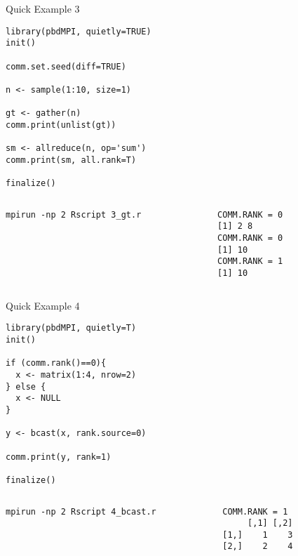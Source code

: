 \begin{frame}
  \begin{exampleblock}{Quick Example 3}
\begin{lstlisting}[title=Reduce and Gather: 3\_gt.r]
library(pbdMPI, quietly=TRUE)
init()

comm.set.seed(diff=TRUE)

n <- sample(1:10, size=1)

gt <- gather(n)
comm.print(unlist(gt))

sm <- allreduce(n, op='sum')
comm.print(sm, all.rank=T)

finalize()
\end{lstlisting}
  \begin{columns}[t,onlytextwidth]
    \begin{column}{0.58\textwidth}
\begin{lstlisting}[backgroundcolor=\color{white},keywordstyle=\color{black},title=Execute this 
script via:]
mpirun -np 2 Rscript 3_gt.r
\end{lstlisting}    
    \end{column}
    \hfill
    \begin{column}{0.4\textwidth}
\begin{lstlisting}[title=Sample Output:]
COMM.RANK = 0
[1] 2 8
COMM.RANK = 0
[1] 10
COMM.RANK = 1
[1] 10
\end{lstlisting}
    \end{column}
​  \end{columns}
  \end{exampleblock}
\end{frame}


\begin{frame}
  \begin{exampleblock}{Quick Example 4}
\begin{lstlisting}[title=Broadcast: 4\_bcast.r]
library(pbdMPI, quietly=T)
init()

if (comm.rank()==0){
  x <- matrix(1:4, nrow=2)
} else {
  x <- NULL
}

y <- bcast(x, rank.source=0)

comm.print(y, rank=1)

finalize()
\end{lstlisting}
  \begin{columns}[t,onlytextwidth]
    \begin{column}{0.58\textwidth}
\begin{lstlisting}[backgroundcolor=\color{white},keywordstyle=\color{black},title=Execute this 
script via:]
mpirun -np 2 Rscript 4_bcast.r
\end{lstlisting}
\end{column}
    \hfill
    \begin{column}{0.4\textwidth}
\begin{lstlisting}[title=Sample Output:]
COMM.RANK = 1
     [,1] [,2]
[1,]    1    3
[2,]    2    4
\end{lstlisting}
    \end{column}
​  \end{columns}
  \end{exampleblock}
\end{frame}
